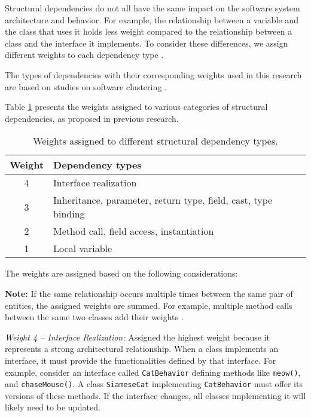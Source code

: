 \hspace{4em}Structural dependencies do not all have the same impact on the software system architecture and behavior. For example, the relationship between a variable and the class that uses it holds less weight compared to the relationship between a class and the interface it implements. To consider these differences, we assign different weights to each dependency type \cite{cluster-access}.

The types of dependencies with their corresponding weights used in this research are based on studies on software clustering \cite{SoraConti, Finding-key-classes}.

Table \ref{tab:structural_weights} presents the weights assigned to various categories of structural dependencies, as proposed in previous research.

\begin{table}[htbp]
\centering
\begin{tabular}{|c|l|}
\hline
\textbf{Weight} & \textbf{Dependency types} \\
\hline
4 & Interface realization \\
3 & Inheritance, parameter, return type, field, cast, type binding \\
2 & Method call, field access, instantiation \\
1 & Local variable \\
\hline
\end{tabular}
\caption{Weights assigned to different structural dependency types. \cite{Finding-key-classes, cluster-access}}
\label{tab:structural_weights}
\end{table}

The weights are assigned based on the following considerations:

\noindent \textbf{Note:} If the same relationship occurs multiple times between the same pair of entities, the assigned weights are summed. For example, multiple method calls between the same two classes add their weights \cite{cluster-access}.

\textit{Weight 4 – Interface Realization:}  
Assigned the highest weight because it represents a strong architectural relationship. When a class implements an interface, it must provide the functionalities defined by that interface. For example, consider an interface called \texttt{CatBehavior} defining methods like \texttt{meow()}, and \texttt{chaseMouse()}. A class \texttt{SiameseCat} implementing \texttt{CatBehavior} must offer its versions of these methods. If the interface changes, all classes implementing it will likely need to be updated.

